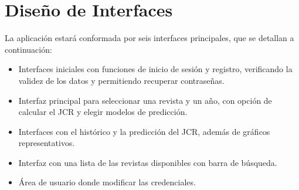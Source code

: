 \section{Diseño de Interfaces}
La aplicación estará conformada por seis interfaces principales, que se detallan a continuación:

\begin{itemize}
    \item Interfaces iniciales con funciones de inicio de sesión y registro, verificando la validez de los datos y permitiendo recuperar contraseñas.
    \item Interfaz principal para seleccionar una revista y un año, con opción de calcular el JCR y elegir modelos de predicción.
    \item Interfaces con el histórico y la predicción del JCR, además de gráficos representativos.
    \item Interfaz con una lista de las revistas disponibles con barra de búsqueda.
    \item Área de usuario donde modificar las credenciales.
\end{itemize}





